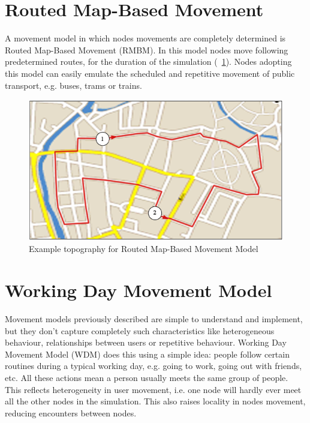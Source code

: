\section{Routed Map-Based Movement}
A movement model in which nodes movements are completely determined is Routed Map-Based Movement (RMBM). In this model nodes move following predetermined routes, for the duration of the simulation (\figurename~\ref{fig:route_map}). Nodes adopting this model can easily emulate the scheduled and repetitive movement of public transport, e.g. buses, trams or trains.
\begin{figure}[!htpb]
  \begin{center}
    \includegraphics[scale=0.6]{4-movimento/img/route_map.png}
    \caption{Example topography for Routed Map-Based Movement Model}    
    \label{fig:route_map}
  \end{center}
\end{figure}

\section{Working Day Movement Model}
\label{descrWDM}
Movement models previously described are simple to understand and implement, but they don't capture completely such characteristics like heterogeneous behaviour, relationships between users or repetitive behaviour. Working Day Movement Model (WDM) \cite{articoloWdm} does this using a simple idea: people follow certain routines during a typical working day, e.g. going to work, going out with friends, etc. All these actions mean a person usually meets the same group of people. This reflects heterogeneity in user movement, i.e. one node will hardly ever meet all the other nodes in the simulation. This also raises locality in nodes movement, reducing encounters between nodes.
\\

